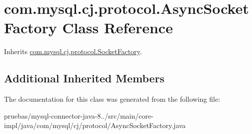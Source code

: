 \hypertarget{classcom_1_1mysql_1_1cj_1_1protocol_1_1_async_socket_factory}{}\section{com.\+mysql.\+cj.\+protocol.\+Async\+Socket\+Factory Class Reference}
\label{classcom_1_1mysql_1_1cj_1_1protocol_1_1_async_socket_factory}


Inherits \mbox{\hyperlink{interfacecom_1_1mysql_1_1cj_1_1protocol_1_1_socket_factory}{com.\+mysql.\+cj.\+protocol.\+Socket\+Factory}}.

\subsection*{Additional Inherited Members}


The documentation for this class was generated from the following file\+:\begin{DoxyCompactItemize}
\item 
pruebas/mysql-\/connector-\/java-\/8../src/main/core-\/impl/java/com/mysql/cj/protocol/Async\+Socket\+Factory.\+java\end{DoxyCompactItemize}
